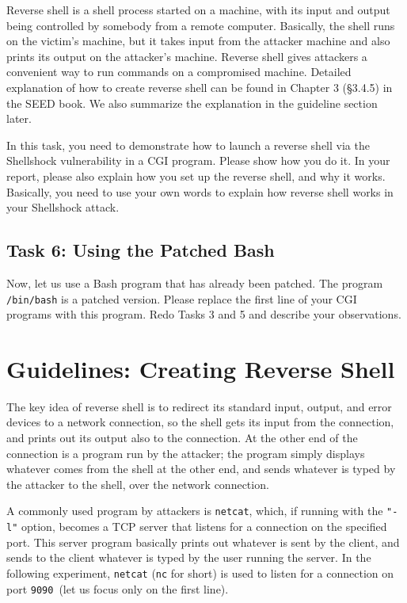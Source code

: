 Reverse shell is a shell process started on a machine, with its input and output being
controlled by somebody from a remote computer. Basically, the shell runs
on the victim's machine, but it takes input from the attacker machine and
also prints its output on the attacker's machine. Reverse shell
gives attackers a convenient way to run commands on a compromised machine. 
Detailed explanation of how to create reverse shell can be found in Chapter
3 (\S 3.4.5) in the SEED book. We also summarize the explanation in
the guideline section later.


In this task, you need to demonstrate 
how to launch a reverse shell via the Shellshock vulnerability in a CGI program. 
Please show how you do it. In your report, please also explain 
how you set up the reverse shell, and why it works. Basically, you need to
use your own words to explain how reverse shell works in your Shellshock
attack. 


\subsection{Task 6: Using the Patched Bash}

Now, let us use a Bash program that has already been patched.
The program \texttt{/bin/bash} is a patched version.
Please replace the first line of 
your CGI programs with this program. 
Redo Tasks 3 and 5 and describe your observations. 


\section{Guidelines: Creating Reverse Shell}
\label{shellshock:sec:reverseshell}


The key idea of reverse shell is to redirect its standard input, output, and error devices to a
network connection, so the shell gets its input from the connection, and prints out its output
also to the connection. At the other end of the connection is a program run by the
attacker; the program simply displays whatever comes from the shell at the other end,
and sends whatever is typed by the attacker to the shell, over the network connection.

A commonly used program by attackers is
\texttt{netcat}, which, if running
with the \texttt{"-l"} option, becomes a TCP server that listens for a connection on the
specified port. This server program basically prints out whatever is sent by the client, and
sends to the client whatever is typed by the user running the server.
In the following experiment, \texttt{netcat} (\texttt{nc} for short) is used
to listen for a connection on port \texttt{9090}~(let us focus only on the first line).


